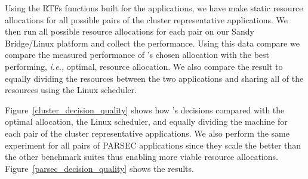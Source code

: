 Using the RTFs functions built for the applications, we have \pacora make static resource allocations for all possible pairs of the cluster representative applications.  We then run all possible resource allocations for each pair on our Sandy Bridge/Linux platform and collect the performance.  Using this data compare we compare the measured performance of \pacora's chosen allocation with the best performing, \emph{i.e.,} optimal, resource allocation.  We also compare the result to equally dividing the resources between the two applications and sharing all of the resources using the Linux scheduler.


Figure~\ref{cluster_decision_quality} shows how \pacora's decisions compared with the optimal allocation, the Linux scheduler, and equally dividing the machine for each pair of the cluster representative applications.  We also perform the same experiment for all pairs of PARSEC applications since they scale the better than the other benchmark suites thus enabling more viable resource allocations.  Figure~\ref{parsec_decision_quality} shows the results.
